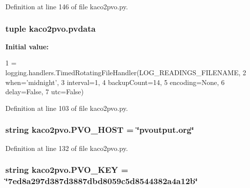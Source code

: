 Definition at line 146 of file kaco2pvo.\+py.

\hypertarget{namespacekaco2pvo_ae4ae0e0b0d3db2f9db79cda692b34f21}{}
\subsubsection[{pvdata}]{\setlength{\rightskip}{0pt plus 5cm}tuple kaco2pvo.\+pvdata}\label{namespacekaco2pvo_ae4ae0e0b0d3db2f9db79cda692b34f21}
{\bfseries Initial value\+:}
\begin{DoxyCode}
1 = logging.handlers.TimedRotatingFileHandler(LOG\_READINGS\_FILENAME,
2                                                    when=\textcolor{stringliteral}{'midnight'},
3                                                    interval=1,
4                                                    backupCount=14,
5                                                    encoding=\textcolor{keywordtype}{None},
6                                                    delay=\textcolor{keyword}{False},
7                                                    utc=\textcolor{keyword}{False})
\end{DoxyCode}


Definition at line 103 of file kaco2pvo.\+py.

\hypertarget{namespacekaco2pvo_a9e9b5ee47557bde93b45c986ada366c4}{}
\subsubsection[{P\+V\+O\+\_\+\+H\+O\+S\+T}]{\setlength{\rightskip}{0pt plus 5cm}string kaco2pvo.\+P\+V\+O\+\_\+\+H\+O\+S\+T = \char`\"{}pvoutput.\+org\char`\"{}}\label{namespacekaco2pvo_a9e9b5ee47557bde93b45c986ada366c4}


Definition at line 132 of file kaco2pvo.\+py.

\hypertarget{namespacekaco2pvo_ad88154b2fb00beb1cfbfae5585af5ac9}{}
\subsubsection[{P\+V\+O\+\_\+\+K\+E\+Y}]{\setlength{\rightskip}{0pt plus 5cm}string kaco2pvo.\+P\+V\+O\+\_\+\+K\+E\+Y = \char`\"{}7ed8a297d387d3887dbd8059c5d8544382a4a12b\char`\"{}}\label{namespacekaco2pvo_ad88154b2fb00beb1cfbfae5585af5ac9}


